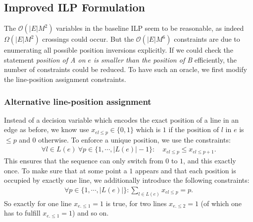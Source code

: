 \documentclass{llncs}
\begin{document}
%
\subsection{Improved ILP Formulation}\label{SEC:improved}
%
The $\mathcal{O}(|E|M^{2})$ variables in the baseline ILP seem to be reasonable, as indeed $\Omega(|E|M^{2})$ crossings could occur. But the $\mathcal{O}(|E|M^{6})$ constraints are due to enumerating all possible position inversions explicitly. If we could check the statement \emph{position of A on $e$ is smaller than the position of B} efficiently, the number of constraints could be reduced. To have such an oracle, we first modify the line-position assignment constraints.

\subsubsection{Alternative line-position assignment}
Instead of a decision variable which encodes the exact position of a line in an edge as before, we know use $x_{el\leq p} \in \{0,1\}$ which is $1$ if the position of $l$ in $e$ is $\leq p$ and $0$ otherwise. To enforce a unique position, we use the constraints:
\begin{align}
	\forall l \in L(e)~ \forall p \in \{1, \cdots, |L(e)|-1\}: \quad x_{el\leq p} \leq x_{el\leq p+1}. \label{EQ:up_constr}
\end{align}
This ensures that the sequence can only switch from $0$ to $1$, and this exactly once. To make sure that at some point a $1$ appears and that each position is occupied by exactly one line, we additionally introduce the following constraints:
\begin{align}
	\forall p \in \{1, \cdots, |L(e)|\}: \sum_{l \in L(e)} x_{el\leq p} = p. \label{EQ:01_constr}
\end{align}
So exactly for  one line $x_{e.\leq 1} =1$ is true, for two lines $x_{e.\leq 2} = 1$ (of which one has to fulfill $x_{e.\leq 1} =1$) and so on.
\end{document}
